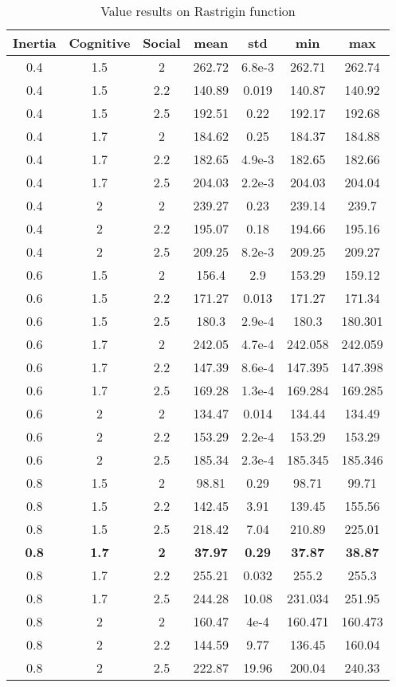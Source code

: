 \documentclass{article}
\begin{document}
\begin{table}[h!]
\centering
\begin{tabular}{ |c|c|c|c|c|c|c| } 
\hline
Inertia & Cognitive & Social & mean & std & min & max\\
\hline
0.4 & 1.5 & 2 & 262.72 & 6.8e-3 & 262.71 & 262.74\\ 
0.4 & 1.5 & 2.2 & 140.89 & 0.019 & 140.87 & 140.92\\ 
0.4 & 1.5 & 2.5 & 192.51 & 0.22 & 192.17 & 192.68\\ 
0.4 & 1.7 & 2 & 184.62 & 0.25 & 184.37 & 184.88\\
0.4 & 1.7 & 2.2 & 182.65 & 4.9e-3 & 182.65 & 182.66\\
0.4 & 1.7 & 2.5 & 204.03 & 2.2e-3 & 204.03 & 204.04\\
0.4 & 2 & 2 & 239.27 & 0.23 & 239.14 & 239.7\\
0.4 & 2 & 2.2 & 195.07 & 0.18 & 194.66 & 195.16\\
0.4 & 2 & 2.5 & 209.25 & 8.2e-3 & 209.25 & 209.27\\
0.6 & 1.5 & 2 & 156.4 & 2.9 & 153.29 & 159.12\\
0.6 & 1.5 & 2.2 & 171.27 & 0.013 & 171.27 & 171.34\\ 
0.6 & 1.5 & 2.5 & 180.3 & 2.9e-4 & 180.3 & 180.301\\ 
0.6 & 1.7 & 2 & 242.05 & 4.7e-4 & 242.058 & 242.059\\
0.6 & 1.7 & 2.2 & 147.39 & 8.6e-4 & 147.395 & 147.398\\
0.6 & 1.7 & 2.5 & 169.28 & 1.3e-4 & 169.284 & 169.285\\
0.6 & 2 & 2 & 134.47 & 0.014 & 134.44 & 134.49\\
0.6 & 2 & 2.2 & 153.29 & 2.2e-4 & 153.29 & 153.29\\
0.6 & 2 & 2.5 & 185.34 & 2.3e-4 & 185.345 & 185.346\\
0.8 & 1.5 & 2 & 98.81 & 0.29 & 98.71 & 99.71\\
0.8 & 1.5 & 2.2 & 142.45 & 3.91 & 139.45 & 155.56\\ 
0.8 & 1.5 & 2.5 & 218.42 & 7.04 & 210.89 & 225.01\\ 
\textbf{0.8} & \textbf{1.7} & \textbf{2} & \textbf{37.97} & \textbf{0.29} & \textbf{37.87} & \textbf{38.87}\\
0.8 & 1.7 & 2.2 & 255.21 & 0.032 & 255.2 & 255.3\\
0.8 & 1.7 & 2.5 & 244.28 & 10.08 & 231.034 & 251.95\\
0.8 & 2 & 2 & 160.47 & 4e-4 & 160.471 & 160.473\\
0.8 & 2 & 2.2 & 144.59 & 9.77 & 136.45 & 160.04\\
0.8 & 2 & 2.5 & 222.87 & 19.96 & 200.04 & 240.33\\
\hline
\end{tabular}
\caption{Value results on Rastrigin function}
\label{table:2}
\end{table}
\end{document}
